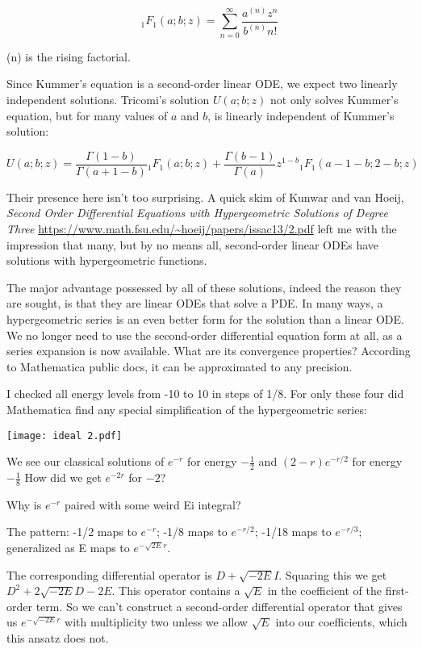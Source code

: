 \documentclass{article}
\begin{document}
\begin{equation}
{}_1F_1(a;b;z) = \sum_{n=0}^\infty \frac{a^{(n)}z^n}{b^{(n)}n!}
\end{equation}

(n) is the rising factorial.

Since Kummer's equation is a second-order linear ODE, we expect two linearly independent
solutions.  Tricomi's solution $U(a;b;z)$ not only solves Kummer's equation, but
for many values of $a$ and $b$, is linearly independent of Kummer's solution:

\begin{equation}
U(a;b;z) = \frac{\Gamma(1-b)}{\Gamma(a+1-b)} {}_1F_1(a;b;z) + \frac{\Gamma(b-1)}{\Gamma(a)} z^{1-b} {}_1F_1(a-1-b;2-b;z)
\end{equation}

Their presence here isn't too surprising.  A quick skim of Kunwar and van Hoeij,
{\it Second Order Differential Equations with Hypergeometric Solutions of Degree Three}
\url{https://www.math.fsu.edu/~hoeij/papers/issac13/2.pdf}
left me with the impression that many, but by no means all, second-order linear ODEs have
solutions with hypergeometric functions.

The major advantage possessed by all of these solutions, indeed the reason they are sought,
is that they are linear ODEs that solve a PDE.  In many ways, a hypergeometric series
is an even better form for the solution than a linear ODE.
We no longer need to use the second-order differential equation
form at all, as a series expansion is now available.  What are its convergence properties?
According to Mathematica public docs, it can be approximated to any precision.

I checked all energy levels from -10 to 10 in steps of 1/8.  For only these four did
Mathematica find any special simplification of the hypergeometric series:

\texttt{[image: ideal 2.pdf]}

We see our classical solutions of $e^{-r}$ for energy $-\frac{1}{2}$ and $(2-r)e^{-r/2}$
for energy $-\frac{1}{8}$  How did we get $e^{-2r}$ for $-2$?

Why is $e^{-r}$ paired with some weird Ei integral?

The pattern: -1/2 maps to $e^{-r}$; -1/8 maps to $e^{-r/2}$; -1/18 maps to $e^{-r/3}$;
generalized as E maps to $e^{-\sqrt{2E}r}$.

The corresponding differential operator is $D+\sqrt{-2E}I$.  Squaring this we get $D^2 + 2\sqrt{-2E}D - 2E$.
This operator contains a $\sqrt{E}$ in the coefficient of the first-order term.  So we can't construct
a second-order differential operator that gives us $e^{-\sqrt{-2E}r}$ with multiplicity two unless we
allow $\sqrt{E}$ into our coefficients, which this ansatz does not.
\end{document}
